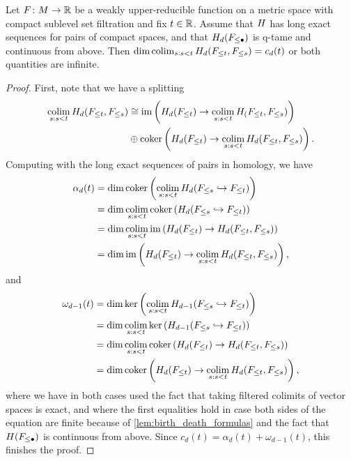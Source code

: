 \begin{prop}\label{prop:cap_limits}
	Let $F \colon M \to \mathbb{R}$ be a weakly upper-reducible function on a metric space with compact sublevel set filtration and fix $t \in \mathbb{R}$.
	Assume that $H$ has long exact sequences for pairs of compact spaces, and that $H_d(F_{\leq \bullet})$ is q-tame and continuous from above.
	Then $\dim \operatorname*{colim}_{s: s < t} H_d(F_{\leq t}, F_{\leq s}) = c_d(t)$ or both quantities are infinite.
\end{prop}
\begin{proof}
	First, note that we have a splitting
	\begin{align*}
	\operatorname*{colim}_{s: s < t} H_d(F_{\leq t}, F_{\leq s})
	&\cong \operatorname{im} \left( H_d(F_{\leq t}) \to \operatorname*{colim}_{s: s < t} H_(F_{\leq t}, F_{\leq s}) \right) \\
	&\oplus \operatorname{coker} \left( H_d(F_{\leq t}) \to \operatorname*{colim}_{s: s < t} H_d(F_{\leq t}, F_{\leq s}) \right).
	\end{align*}
	Computing with the long exact sequences of pairs in homology, we have
	\begin{align*}
		\alpha_d(t)
		&= \dim \operatorname{coker} \left( \operatorname*{colim}_{s: s < t} H_d(F_{\leq s} \hookrightarrow F_{\leq t}) \right) \\
		&= \dim \operatorname*{colim}_{s: s < t} \operatorname{coker} \left( H_d(F_{\leq s} \hookrightarrow F_{\leq t}) \right) \\
		&= \dim \operatorname*{colim}_{s: s < t} \operatorname{im} \left( H_d(F_{\leq t}) \to H_d(F_{\leq t}, F_{\leq s}) \right) \\
		&= \dim \operatorname{im} \left( H_d(F_{\leq t}) \to \operatorname*{colim}_{s: s < t} H_d(F_{\leq t}, F_{\leq s}) \right), \\
	\end{align*}
	and
	\begin{align*}
		\omega_{d-1}(t)
		&= \dim \ker \left( \operatorname*{colim}_{s: s < t} H_{d-1}(F_{\leq s} \hookrightarrow F_{\leq t}) \right) \\
		&= \dim \operatorname*{colim}_{s: s < t} \ker \left( H_{d-1}(F_{\leq s} \hookrightarrow F_{\leq t}) \right) \\
		&= \dim \operatorname*{colim}_{s: s < t} \operatorname{coker} \left( H_d(F_{\leq t}) \to H_d(F_{\leq t}, F_{\leq s}) \right) \\
		&= \dim \operatorname{coker} \left( H_d(F_{\leq t}) \to \operatorname*{colim}_{s: s < t} H_d(F_{\leq t}, F_{\leq s}) \right), \\
	\end{align*}
	where we have in both cases used the fact that taking filtered colimits of vector spaces is exact, and where the first equalities hold in case both sides of the equation are finite because of \cref{lem:birth_death_formulas} and the fact that $H(F_{\leq \bullet})$ is continuous from above.
	Since $c_d(t) = \alpha_d(t) + \omega_{d-1}(t)$, this finishes the proof.
\end{proof}

